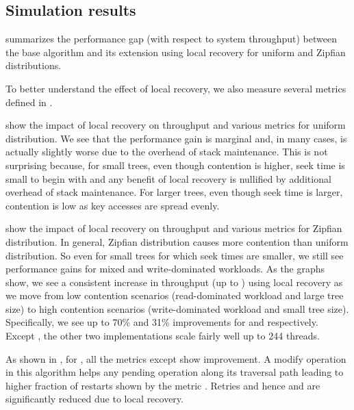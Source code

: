 \subsection*{Simulation results}
 summarizes the performance gap (with respect to system throughput) between the base algorithm and its extension using local recovery for uniform and Zipfian distributions. 


To better understand the effect of local recovery, we also measure several metrics defined in .

 show the impact of local recovery on throughput and various metrics for uniform distribution. We see that the performance gain is marginal and, in many cases, is actually slightly worse due to the overhead of stack maintenance. This is not surprising because, for small trees, even though contention is higher, seek time is small to begin with and any benefit of local recovery is nullified by additional overhead of stack maintenance. For larger trees, even though seek time is larger, contention is low as key accesses are spread evenly.



 show the impact of local recovery on throughput and various metrics for Zipfian distribution.  In general, Zipfian distribution causes more contention than uniform distribution. So even for small trees for which seek times are smaller, we still see performance gains for mixed and write-dominated workloads. As the graphs show,  we see a consistent increase in throughput (up to \localRecoveryMaximumgap{}) using local recovery as we move from low contention scenarios (read-dominated workload and large tree size)  to high contention scenarios (write-dominated workload and small tree size). Specifically, we see up to 70\% and 31\% improvements for \HJBST{} and \CASTLE{} respectively. Except \CITRUS{}, the other two implementations scale fairly well up to 244 threads.



As shown in , for \HJBST{}, all the metrics except \modifyTime{} show improvement.
A modify operation in this algorithm helps any pending operation along its traversal path leading to higher fraction of restarts shown by the metric \retries.
Retries and hence \seekLength{} and \seekTime{} are significantly reduced due to local recovery.

